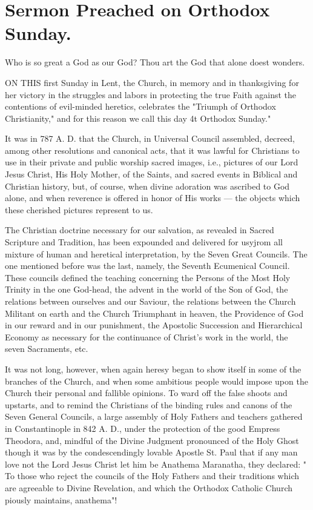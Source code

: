 \chapter{Sermon Preached on Orthodox Sunday.}

Who is so great a God as our God? Thou art the God that alone doest wonders.

ON THIS first Sunday in Lent, the Church, 
in memory and in thanksgiving for her victory
in the struggles and labors in protecting 
the true Faith against the contentions of evil-minded
heretics, celebrates the "Triumph of 
Orthodox Christianity," and for this reason we 
call this day 4t Orthodox Sunday." 

It was in 787 A. D. that the Church, in Universal
Council assembled, decreed, among other 
resolutions and canonical acts, that it was lawful 
for Christians to use in their private and public 
worship sacred images, i.e., pictures of our 
Lord Jesus Christ, His Holy Mother, of the 
Saints, and sacred events in Biblical and Christian
history, but, of course, when divine adoration
was ascribed to God alone, and when reverence
is offered in honor of His works — the 
objects which these cherished pictures represent 
to us. 

The Christian doctrine necessary for our salvation,
as revealed in Sacred Scripture and 
Tradition, has been expounded and delivered 
for usyjrom all mixture of human and heretical 
interpretation, by the Seven Great Councils. 
The one mentioned before was the last, namely, 
the Seventh Ecumenical Council. These councils
defined the teaching concerning the Persons 
of the Most Holy Trinity in the one God-head, 
the advent in the world of the Son of God, the 
relations between ourselves and our Saviour, 
the relations between the Church Militant on 
earth and the Church Triumphant in heaven, 
the Providence of God in our reward and in 
our punishment, the Apostolic Succession and 
Hierarchical Economy as necessary for the continuance
of Christ's work in the world, the seven 
Sacraments, etc. 

It was not long, however, when again heresy 
began to show itself in some of the branches of 
the Church, and when some ambitious people 
would impose upon the Church their personal 
and fallible opinions. To ward off the false 
shoots and upstarts, and to remind the Christians
of the binding rules and canons of the 
Seven General Councils, a large assembly of 
Holy Fathers and teachers gathered in Constantinople
in 842 A. D., under the protection 
of the good Empress Theodora, and, mindful of 
the Divine Judgment pronounced of the Holy 
Ghost though it was by the condescendingly 
lovable Apostle St. Paul that if any man love 
not the Lord Jesus Christ let him be Anathema 
Maranatha, they declared: " To those who reject
the councils of the Holy Fathers and their 
traditions which are agreeable to Divine Revelation,
and which the Orthodox Catholic Church 
piously maintains, anathema"! 

